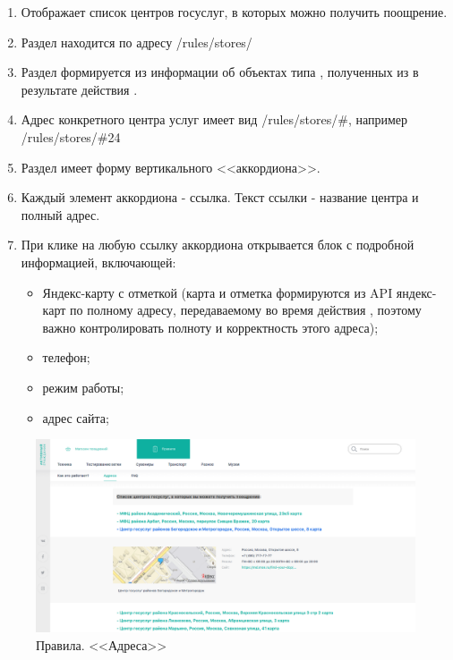             \begin{enumerate}
                \item Отображает список центров госуслуг, в которых можно получить поощрение.
                \item Раздел находится по адресу /rules/stores/
                \item Раздел формируется из информации об объектах типа , полученных из  в результате действия .
                \item Адрес конкретного центра услуг имеет вид /rules/stores/\#<ID центра>, например /rules/stores/\#24
                \item Раздел имеет форму вертикального <<аккордиона>>. 
                \item Каждый элемент аккордиона - ссылка. Текст ссылки - название центра и полный адрес.
                \item При клике на любую ссылку аккордиона открывается блок с подробной информацией, включающей:
                    \begin{itemize}
                        \item Яндекс-карту с отметкой (карта и отметка формируются 
                            из API яндекс-карт по полному адресу, передаваемому во время действия 
                            , поэтому важно контролировать полноту и корректность этого адреса);
                        \item телефон;
                        \item режим работы;
                        \item адрес сайта;
                    \end{itemize}
            \end{enumerate}
            
        \begin{figure}
            \includegraphics[width=170mm]{02_noauth_funcs/figures/10.eps}
            \caption{Правила. <<Адреса>>}
            \label{fig:page_address}
        \end{figure} 
            
